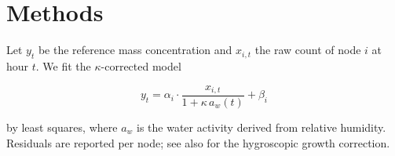 \section{Methods}
\label{sec:methods}

Let $y_t$ be the reference mass concentration and $x_{i,t}$ the raw count
of node $i$ at hour $t$. We fit the \(\kappa\)-corrected model

\begin{equation}
  \label{eq:model}
  y_t = \alpha_i \cdot \frac{x_{i,t}}{1 + \kappa \, a_w(t)} + \beta_i
\end{equation}

by least squares, where $a_w$ is the water activity derived from relative
humidity. Residuals are reported per node; see also \cite{difantonio2018}
for the hygroscopic growth correction.
